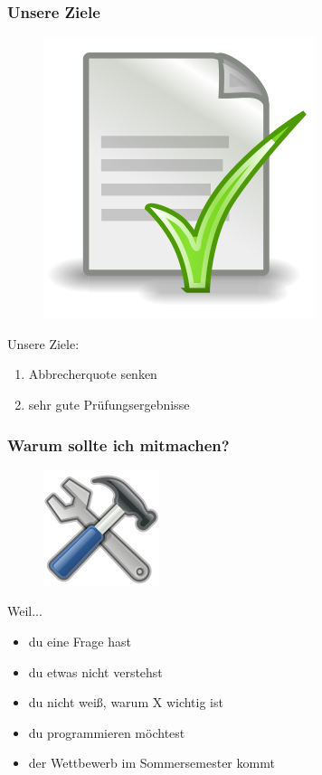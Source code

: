 \documentclass[12pt]{beamer}
\begin{document}
\begin{frame}

	\frametitle{Unsere Ziele}

	\begin{figure}
		\includegraphics[scale=0.15]{src/img/doc}
	\end{figure}

	Unsere Ziele:
	\begin{enumerate}
		\item Abbrecherquote senken
		\item sehr gute Prüfungsergebnisse
	\end{enumerate}

\end{frame}

\begin{frame}

	\frametitle{Warum sollte ich mitmachen?}

	\begin{figure}
		\includegraphics[scale=0.55555]{src/img/tools}
	\end{figure}


	Weil...
	\pause
	\begin{itemize}
		\item du eine Frage hast
		\pause
		\item du etwas nicht verstehst
		\pause
		\item du nicht weiß, warum X wichtig ist
		\pause
		\item du programmieren möchtest
		\pause
		\item der Wettbewerb im Sommersemester kommt
	\end{itemize}

\end{frame}
\end{document}
